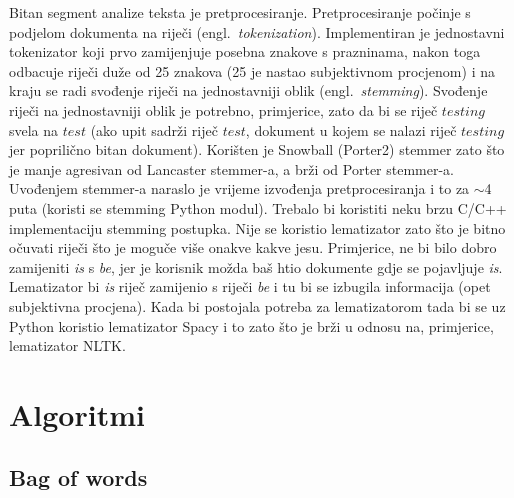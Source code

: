 \documentclass[a4paper,12pt]{article}
\newcommand{\engl}[1]{(engl.~\emph{#1})}
\begin{document}
Bitan segment analize teksta je pretprocesiranje. Pretprocesiranje počinje s podjelom dokumenta na riječi \engl{tokenization}. Implementiran je jednostavni tokenizator koji prvo zamijenjuje posebna znakove s prazninama, nakon toga odbacuje riječi duže od 25 znakova (25 je nastao subjektivnom procjenom) i na kraju se radi svođenje riječi na jednostavniji oblik \engl{stemming}. Svođenje riječi na jednostavniji oblik je potrebno, primjerice, zato da bi se riječ $testing$ svela na $test$ (ako upit sadrži riječ $test$, dokument u kojem se nalazi riječ $testing$ jer poprilično bitan dokument). Korišten je Snowball (Porter2) stemmer zato što je manje agresivan od Lancaster stemmer-a, a brži od Porter stemmer-a. Uvođenjem stemmer-a naraslo je vrijeme izvođenja pretprocesiranja i to za $\sim$4 puta (koristi se stemming Python modul). Trebalo bi koristiti neku brzu C/C++ implementaciju stemming postupka. Nije se koristio lematizator zato što je bitno očuvati riječi što je moguče više onakve kakve jesu. Primjerice, ne bi bilo dobro zamijeniti \textit{is} s \textit{be}, jer je korisnik možda baš htio dokumente gdje se pojavljuje \textit{is}. Lematizator bi \textit{is} riječ zamijenio s riječi \textit{be} i tu bi se izbugila informacija (opet subjektivna procjena). Kada bi postojala potreba za lematizatorom tada bi se uz Python koristio lematizator Spacy i to zato što je brži u odnosu na, primjerice, lematizator NLTK. 

\section{Algoritmi}

\subsection{Bag of words}
\end{document}
